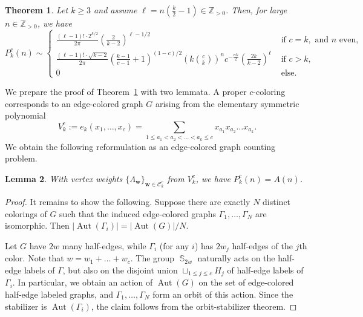 \documentclass[a4paper,oneside]{amsart}
\newcommand{\bb}[1]{\boldsymbol{#1}}
\newtheorem{theorem}{Theorem}
\numberwithin{theorem}{section}
\newtheorem{lemma}[theorem]{Lemma}
\theoremstyle{remark}
\newcommand{\Z}{\mathbb{Z}}
\DeclareMathOperator{\Aut}{Aut}
\newcommand{\cE}{{P}}
\DeclareMathOperator{\Sym}{\mathbb{S}}
\begin{document}
\begin{theorem}
  \label{thm:asymptotic_edge_colorings}
  Let $k\geq 3$ and assume $\ell = n\left(\tfrac{k}{2}-1\right) \in \Z_{>0}$. Then, for large $n\in \Z_{>0}$, we have
  \[
    \cE^{c}_k(n) \sim \left\{ \begin{array}{ll}
      \frac{(\ell-1)! \cdot 2^{k/2}}{2\pi} \left( \frac{2}{k-2} \right)^{\ell-1/2} & \text{ if } c=k, \text{ and } n \text{ even},\\
      \frac{(\ell-1)! \cdot \sqrt{k-2}}{2\pi} \left( \frac{k-1}{c-1} + 1 \right)^{(1-c)/2} \left( k \binom{c}{k} \right)^n c^{-\frac{nk}{2}}
\left( \frac{2k}{k-2} \right)^\ell & \text{ if } c > k,\\
      0 & \text{ else.}
    \end{array}\right.
  \]
\end{theorem}

We prepare the proof of Theorem~\ref{thm:asymptotic_edge_colorings} with two lemmata. A proper $c$-coloring corresponds to an edge-colored graph $G$ arising from the elementary symmetric polynomial
\[
  V_k^c := e_k(x_1,\dots,x_c) = \sum_{1\leq a_1 < a_2 <\dots < a_k \leq c} x_{a_1}x_{a_2}\dots x_{a_k}.
\]
We obtain the following reformulation as an edge-colored graph counting problem.

\begin{lemma}
  \label{lem:coloring_as_colored_graph}
  With vertex weights $\{\Lambda_{\bb{w}}\}_{\bb w \in\mathcal C_k^c}$ from $V_k^c$, we have $\cE^{c}_k(n) = A(n)$.
\end{lemma}

\begin{proof}
  It remains to show the following. Suppose there are exactly $N$ distinct colorings of $G$ such that the induced edge-colored graphs $\Gamma_1,\dots,\Gamma_N$ are isomorphic. Then $|\Aut(\Gamma_i)| = |\Aut(G)|/N$. \par
  Let $G$ have $2w$ many half-edges, while $\Gamma_i$ (for any $i$) has $2w_j$ half-edges of the $j$th color. Note that $w = w_1+\dots + w_c$. The group $\Sym_{2w}$ naturally acts on the half-edge labels of $\Gamma$, but also on the disjoint union $\sqcup_{1\leq j\leq c} H_j$ of half-edge labels of $\Gamma_i$. In particular, we obtain an action of $\Aut(G)$ on the set of edge-colored half-edge labeled graphs, and $\Gamma_1,\dots,\Gamma_N$ form an orbit of this action. Since the stabilizer is $\Aut(\Gamma_i)$, the claim follows from the orbit-stabilizer theorem.
\end{proof}
\end{document}
